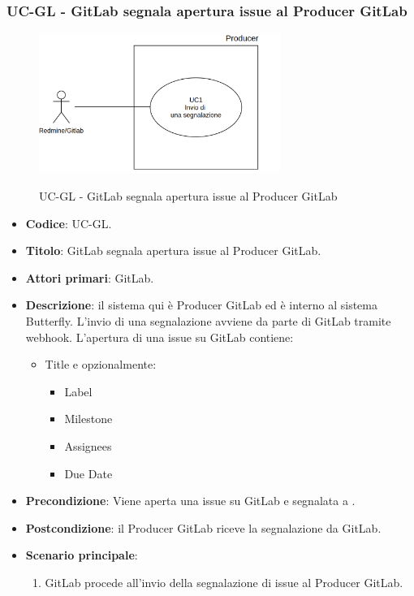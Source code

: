 \subsubsection{UC\theuccount-GL - GitLab segnala apertura issue al Producer GitLab}
	\begin{figure}[H]
		\centering
		\includegraphics[width=0.7\textwidth]{img/UC1.png}\\
		\caption{UC\theuccount-GL - GitLab segnala apertura issue al Producer GitLab}
	\end{figure}
	\begin{itemize}
		\item \textbf{Codice}: UC\theuccount-GL.
		\item \textbf{Titolo}: GitLab segnala apertura issue al Producer GitLab.
		\item \textbf{Attori primari}: GitLab.
		\item \textbf{Descrizione}: il sistema qui è Producer GitLab ed è interno al sistema Butterfly. L'invio di
		una segnalazione avviene da parte di GitLab tramite webhook. L'apertura di
		una issue su GitLab contiene:
		\begin{itemize}
			\item Title e opzionalmente:
			\begin{itemize}
				\item Label
				\item Milestone
				\item Assignees
				\item Due Date
			\end{itemize}
		\end{itemize}
		\item \textbf{Precondizione}: Viene aperta una issue su GitLab e 
		segnalata a \progetto.
		\item \textbf{Postcondizione}: il Producer GitLab riceve la segnalazione da GitLab.
		\item \textbf{Scenario principale}: 
		\begin{enumerate}
			\item GitLab procede all'invio della segnalazione di issue al Producer GitLab.
		\end{enumerate}
		
	\end{itemize}
	
